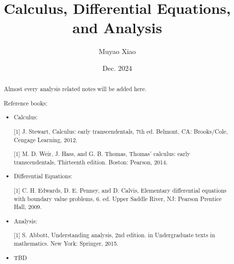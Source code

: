 \documentclass[a4paper]{report}
\title{Calculus, Differential Equations, and Analysis}
\author{Muyao Xiao}
\date{Dec. 2024}
\begin{document}
\maketitle

\begin{abstract}
    Almost every analysis related notes will be added here.

    Reference books:
    \begin{itemize}
        \item Calculus:
        
        [1] J. Stewart, Calculus: early transcendentals, 7th ed. Belmont, CA: Brooks/Cole, Cengage Learning, 2012.

        [1] M. D. Weir, J. Hass, and G. B. Thomas, Thomas’ calculus: early transcendentals, Thirteenth edition. Boston: Pearson, 2014.


        \item Differential Equations:

        [1] C. H. Edwards, D. E. Penney, and D. Calvis, Elementary differential equations with boundary value problems, 6. ed. Upper Saddle River, NJ: Pearson Prentice Hall, 2009.

        \item Analysis:
        
        [1] S. Abbott, Understanding analysis, 2nd edition. in Undergraduate texts in mathematics. New York: Springer, 2015.

        \item TBD
    \end{itemize}
\end{abstract}

\tableofcontents


\pagestyle{plain}
\printbibliography{}
\end{document}

